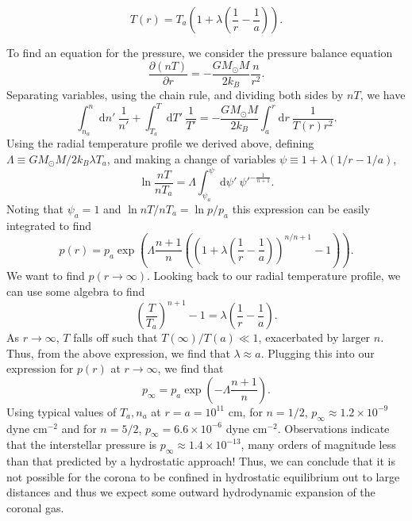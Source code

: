\begin{enumerate}
\begin{enumerate}
				\begin{equation}
					T(r)=T_a\left(1+\lambda\left(\frac{1}{r} - \frac{1}{a}\right)\right).
				\end{equation}
				\par To find an equation for the pressure, we consider the pressure balance equation
				\begin{equation}
					\frac{\partial (nT)}{\partial r} = -\frac{GM_{\odot}M}{2k_B}\frac{n}{r^2}.
				\end{equation}
				Separating variables, using the chain rule, and dividing both sides by $nT$, we have
				\begin{equation}
					\int_{n_a}^{n}\mathrm{d}n'~\frac{1}{n'} + \int_{T_a}^{T}\mathrm{d}T'~\frac{1}{T'} = -\frac{GM_{\odot}M}{2k_B}\int^r_a\mathrm{d}r~\frac{1}{T(r)r^2}.
				\end{equation}
				Using the radial temperature profile we derived above, defining $\Lambda\equiv GM_{\odot}M/2k_B\lambda T_a$, and making a change of variables $\psi\equiv 1 + \lambda(1/r - 1/a)$, 
				\begin{equation}
					\ln{\frac{nT}{nT_a}} = \Lambda\int^{\psi}_{\psi_a}\mathrm{d}\psi'~\psi'^{-\frac{1}{n+1}}.
				\end{equation}
				Noting that $\psi_a=1$ and $\ln{nT/nT_a}=\ln{p/p_a}$ this expression can be easily integrated to find
				\begin{equation}
					p(r) = p_a\exp\left(\Lambda\frac{n+1}{n}\left(\left(1 + \lambda\left(\frac{1}{r} - \frac{1}{a}\right)\right)^{n/n+1} - 1 \right)\right).
				\end{equation}
				We want to find $p(r\to\infty)$. Looking back to our radial temperature profile, we can use some algebra to find
				\begin{equation}
					\left(\frac{T}{T_a}\right)^{n+1} - 1 = \lambda\left(\frac{1}{r} - \frac{1}{a}\right).
				\end{equation}
				As $r\to\infty$, $T$ falls off such that $T(\infty)/T(a)\ll1$, exacerbated by larger $n$. Thus, from the above expression, we find that $\lambda\approx a$. Plugging this into our expression for $p(r)$ at $r\to\infty$, we find that 
				\begin{equation}
					p_{\infty} = p_a\exp\left(-\Lambda\frac{n+1}{n}\right).
				\end{equation}
				Using typical values of $T_a,n_a$ at $r=a=10^{11}$ cm, for $n=1/2$, $p_{\infty}\approx1.2\times10^{-9}$ dyne cm$^{-2}$ and for $n=5/2$, $p_{\infty}=6.6\times10^{-6}$ dyne cm$^{-2}$. Observations indicate that the interstellar pressure is $p_{\infty}\approx1.4\times10^{-13}$, many orders of magnitude less than that predicted by a hydrostatic approach! Thus, we can conclude that it is not possible for the corona to be confined in hydrostatic equilibrium out to large distances and thus we expect some outward hydrodynamic expansion of the coronal gas.

\end{enumerate}
\end{enumerate}

